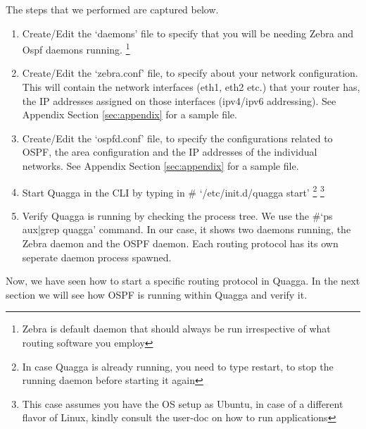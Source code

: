 \documentclass{article}
\begin{document}
The steps that we performed are captured below.
\begin{enumerate}
  \item Create/Edit the `daemons' file to specify that you will be needing Zebra 
    and Ospf daemons running. \footnote{Zebra is default daemon that should always 
      be run irrespective of what routing software you employ}
  \item Create/Edit the `zebra.conf' file, to specify about your network configuration.
    This will contain the network interfaces (eth1, eth2 etc.) that your router has,
    the IP addresses assigned on those interfaces (ipv4/ipv6 addressing).
    See Appendix Section \ref{sec:appendix} for a sample file.
  \item Create/Edit the `ospfd.conf' file, to specify the configurations related to OSPF, 
    the area configuration and the IP addresses of the individual networks.
    See Appendix Section \ref{sec:appendix} for a sample file.
  \item Start Quagga in the CLI by typing in \# `/etc/init.d/quagga start' 
    \footnote{In case Quagga is already running, you need to type restart, to stop the running daemon before starting it again}
    \footnote{This case assumes you have the OS setup as Ubuntu, in case of a different flavor of Linux, kindly consult the user-doc on how to run applications}
  \item Verify Quagga is running by checking the process tree. We use the \#`ps aux|grep quagga' command.
    In our case, it shows two daemons running, the Zebra daemon and the OSPF daemon. Each routing protocol has its own seperate daemon process spawned.
\end{enumerate}

Now, we have seen how to start a specific routing protocol in Quagga. In the next section we will see how OSPF is running within Quagga and verify it.
\clearpage
\end{document}
